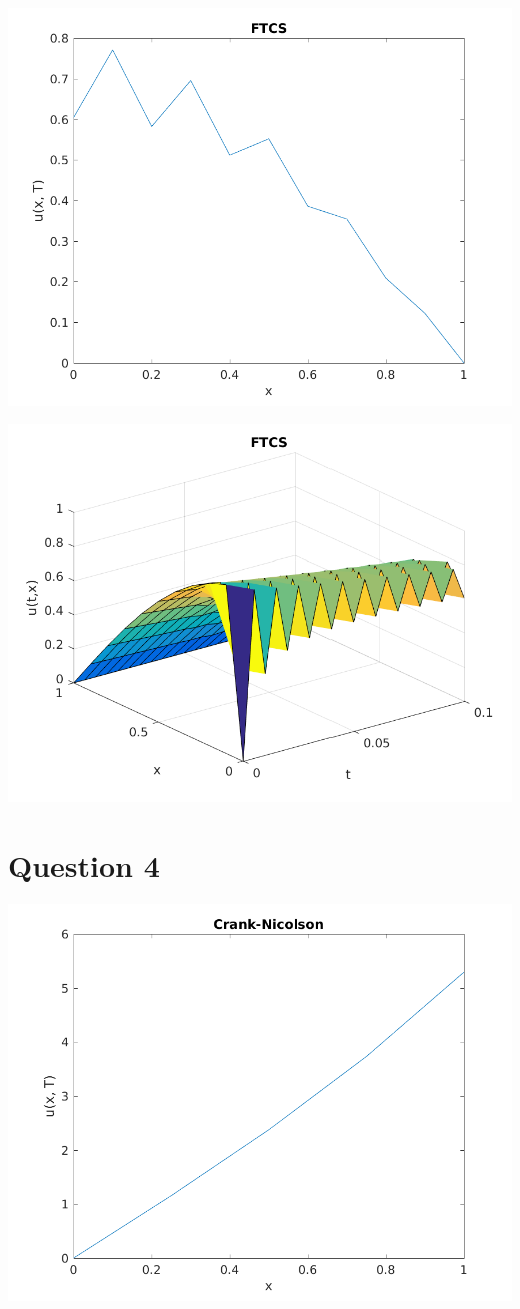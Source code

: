 \documentclass{article}
\begin{document}
\includegraphics{"q3_5"}
\pagebreak

\includegraphics{"q3_6"}
\pagebreak

\section{Question 4}

\includegraphics{"q4_1"}
\pagebreak
\end{document}

